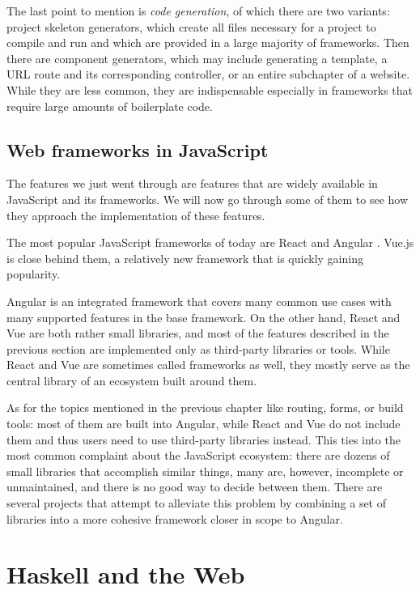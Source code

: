 \documentclass[english,zadani,odsaz]{fitthesis}
\begin{document}
The last point to mention is \emph{code generation}, of which there are two variants:
project skeleton generators, which create all files necessary for a project to
compile and run and which are provided in a large majority of frameworks. Then
there are component generators, which may include generating a template, a URL
route and its corresponding controller, or an entire subchapter of a
website. While they are less common, they are indispensable especially in
frameworks that require large amounts of boilerplate code.

\section{Web frameworks in JavaScript}
\label{sec:orga6e1cd0}
The features we just went through are features that are widely available in
JavaScript and its frameworks. We will now go through some of them to see how
they approach the implementation of these features.

The most popular JavaScript frameworks of today are React and Angular
\cite{frontend-cmp}. Vue.js is close behind them, a relatively new framework that
is quickly gaining popularity.

Angular is an integrated framework that covers many common use cases with many
supported features in the base framework. On the other hand, React and Vue are
both rather small libraries, and most of the features described in the previous
section are implemented only as third-party libraries or tools. While React and
Vue are sometimes called frameworks as well, they mostly serve as the central
library of an ecosystem built around them.

As for the topics mentioned in the previous chapter like routing, forms, or
build tools: most of them are built into Angular, while React and Vue do not
include them and thus users need to use third-party libraries instead. This ties
into the most common complaint about the JavaScript ecosystem: there are dozens
of small libraries that accomplish similar things, many are, however, incomplete
or unmaintained, and there is no good way to decide between them. There are
several projects that attempt to alleviate this problem by combining a set of
libraries into a more cohesive framework closer in scope to Angular.

\chapter{Haskell and the Web}
\label{sec:org8d282c8}
\end{document}
